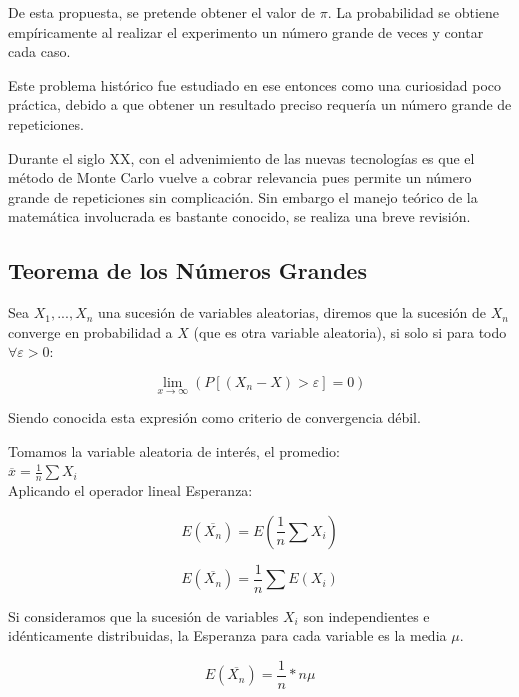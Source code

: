 \documentclass{rbf}
\begin{document}
De esta propuesta, se pretende obtener el valor de $\pi$. La probabilidad se obtiene empíricamente al realizar el experimento un número grande de veces y contar cada caso.

Este problema histórico fue estudiado en ese entonces como una curiosidad poco práctica, debido a que obtener un resultado preciso requería un número grande de repeticiones. 

Durante el siglo XX, con el advenimiento de las nuevas tecnologías es que el método de Monte Carlo vuelve a cobrar relevancia pues permite un número grande de repeticiones sin complicación. Sin embargo el manejo teórico de la matemática involucrada es bastante conocido, se realiza una breve revisión.

\subsection{Teorema de los Números Grandes}

Sea $X_1,..., X_n$ una sucesión de variables aleatorias, diremos que la sucesión de ${X_n}$ converge en probabilidad a $X$ (que es otra variable aleatoria), si solo si para todo $\forall \varepsilon >0$:

\begin{equation}
   \displaystyle \lim_{x \to \infty}(P[(X_n - X)>\varepsilon]=0)
\end{equation}

Siendo conocida esta expresión como criterio de convergencia débil. 

Tomamos la variable aleatoria de interés, el promedio: \\

$\overline{x}=\frac{1}{n}\sum X_i$  
\\

Aplicando el operador lineal Esperanza:

\begin{equation}
  \displaystyle  E(\overline{X_n})=E(\frac{1}{n} \sum X_i)
\end{equation}

\begin{equation}
  \displaystyle  E(\overline{X_n})=\frac{1}{n} \sum E(X_i)
\end{equation}

Si consideramos que la sucesión de variables $X_i$ son independientes e idénticamente distribuidas, la Esperanza para cada variable es la media $\mu$.

\begin{equation}
  \displaystyle  E(\overline{X_n})=\frac{1}{n} *n\mu
\end{equation}
\end{document}
